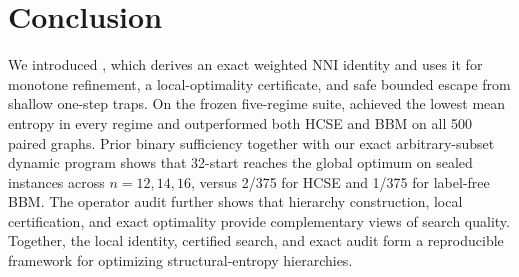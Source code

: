 \section{Conclusion}
We introduced \NEST, which derives an exact weighted NNI identity and uses it
for monotone refinement, a local-optimality certificate, and safe bounded
escape from shallow one-step traps. On the frozen five-regime suite, \NEST
achieved the lowest mean entropy in every regime and outperformed both HCSE and
BBM on all 500 paired graphs. Prior binary sufficiency together with our exact
arbitrary-subset dynamic program shows that 32-start \NEST reaches the global
optimum on \ScaleCombinedExact{} sealed instances across $n=12,14,16$, versus
2/375 for HCSE and 1/375 for label-free BBM. The operator audit further shows
that hierarchy construction, local certification, and exact optimality provide
complementary views of search quality. Together, the local identity, certified
search, and exact audit form a reproducible framework for optimizing
structural-entropy hierarchies.
